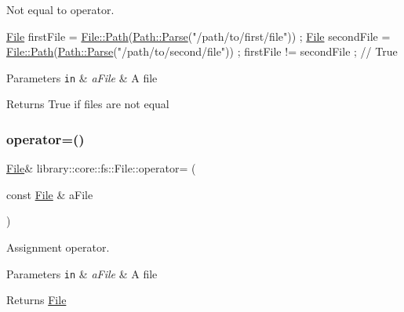 Not equal to operator. 


\begin{DoxyCode}
\hyperlink{classlibrary_1_1core_1_1fs_1_1File_a7490060f19a21d4ee58bb6cec87a1ca6}{File} firstFile = \hyperlink{classlibrary_1_1core_1_1fs_1_1File_a0e0d8a8becb3cdd21775554e181452d8}{File::Path}(\hyperlink{classlibrary_1_1core_1_1fs_1_1Path_aebf5bd3af83e0b7376616e146f3e55df}{Path::Parse}(\textcolor{stringliteral}{"/path/to/first/file"})) ;
\hyperlink{classlibrary_1_1core_1_1fs_1_1File_a7490060f19a21d4ee58bb6cec87a1ca6}{File} secondFile = \hyperlink{classlibrary_1_1core_1_1fs_1_1File_a0e0d8a8becb3cdd21775554e181452d8}{File::Path}(\hyperlink{classlibrary_1_1core_1_1fs_1_1Path_aebf5bd3af83e0b7376616e146f3e55df}{Path::Parse}(\textcolor{stringliteral}{"/path/to/second/file"})) ;
firstFile != secondFile ; \textcolor{comment}{// True}
\end{DoxyCode}



\begin{DoxyParams}[1]{Parameters}
\mbox{\tt in}  & {\em a\+File} & A file \\
\hline
\end{DoxyParams}
\begin{DoxyReturn}{Returns}
True if files are not equal 
\end{DoxyReturn}
\mbox{\label{classlibrary_1_1core_1_1fs_1_1File_a2bea020568e39a80c69be787418c28ba}} 
\subsubsection{\texorpdfstring{operator=()}{operator=()}}
{\footnotesize\ttfamily \hyperlink{classlibrary_1_1core_1_1fs_1_1File}{File}\& library\+::core\+::fs\+::\+File\+::operator= (\begin{DoxyParamCaption}\item[{const \hyperlink{classlibrary_1_1core_1_1fs_1_1File}{File} \&}]{a\+File }\end{DoxyParamCaption})}



Assignment operator. 


\begin{DoxyParams}[1]{Parameters}
\mbox{\tt in}  & {\em a\+File} & A file \\
\hline
\end{DoxyParams}
\begin{DoxyReturn}{Returns}
\hyperlink{classlibrary_1_1core_1_1fs_1_1File}{File} 
\end{DoxyReturn}
\mbox{\label{classlibrary_1_1core_1_1fs_1_1File_a44ab79a23c5a129be298a026dbeec62f}} 
